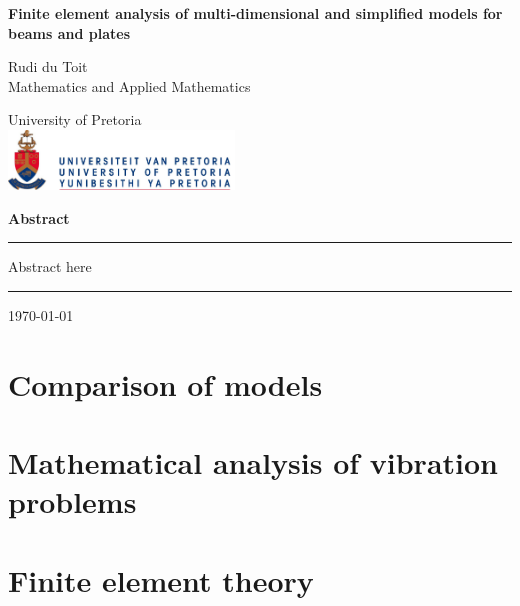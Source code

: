 \documentclass[12pt]{report}
\begin{document}
\begin{titlepage}
  \centering
  \vspace*{0.3in}
  {\Huge\bfseries Finite element analysis of multi-dimensional and simplified models for beams and plates\par}
  \vspace{0.5in}
  {\Large Rudi du Toit\\[0.1in]}
  Mathematics and Applied Mathematics\par
  \vspace{0.5in}
  {\Large University of Pretoria\\
    \includegraphics[width=6cm]{images/logo-up.jpg}\par}
  \vspace{0.5in}
  {\LARGE\bfseries Abstract\par}
  \vspace{0.1in}
  \hrule
  \vspace{0.1in}
  \begin{minipage}{0.9\textwidth}
    Abstract here
  \end{minipage}
  \vspace{0.1in}
  \hrule
  \vfill
  \today
\end{titlepage}



\tableofcontents

\chapter{Comparison of models}







\chapter{Mathematical analysis of vibration problems}


\chapter{Finite element theory}


\end{document}
